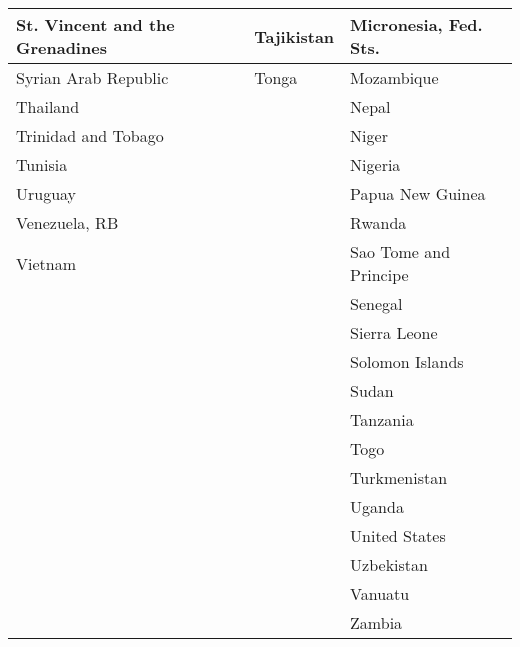 \begin{longtable}{|l|l|l|}
\hline
St. Vincent and the Grenadines&Tajikistan&Micronesia, Fed. Sts.\\
\hline
Syrian Arab Republic&Tonga&Mozambique\\
\hline
Thailand&&Nepal\\
\hline
Trinidad and Tobago&&Niger\\
\hline
Tunisia&&Nigeria\\
\hline
Uruguay&&Papua New Guinea\\
\hline
Venezuela, RB&&Rwanda\\
\hline
Vietnam&&Sao Tome and Principe\\
\hline
&&Senegal\\
\hline
&&Sierra Leone\\
\hline
&&Solomon Islands\\
\hline
&&Sudan\\
\hline
&&Tanzania\\
\hline
&&Togo\\
\hline
&&Turkmenistan\\
\hline
&&Uganda\\
\hline
&&United States\\
\hline
&&Uzbekistan\\
\hline
&&Vanuatu\\
\hline
&&Zambia\\
\hline
\end{longtable}
